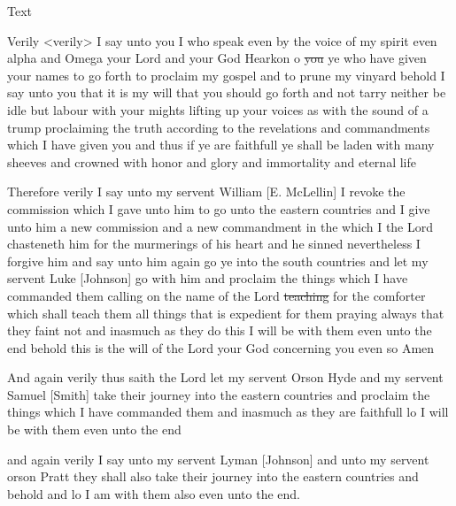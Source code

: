 			\begin{description}
				\item[Text]
			\end{description}
			
				Verily <verily> I say unto you I who speak even by the voice of my spirit even alpha and Omega your Lord and your God Hearkon o \sout{you} ye who have given your names to go forth to proclaim my gospel and to prune my vinyard behold I say unto you that it is my will that you should go forth and not tarry neither be idle but labour with your mights lifting up your voices as with the sound of a trump proclaiming the truth according to the revelations and commandments which I have given you and thus if ye are faithfull ye shall be laden with many sheeves and crowned with honor and glory and immortality and eternal life
				
				Therefore verily I say unto my servent William [E. McLellin] I revoke the commission which I gave unto him to go unto the eastern countries and I give unto him a new commission and a new commandment in the which I the Lord chasteneth him for the murmerings of his heart and he sinned nevertheless I forgive him and say unto him again go ye into the south countries and let my servent Luke [Johnson] go with him and proclaim the things which I have commanded them calling on the name of the Lord \sout{teaching} for the comforter which shall teach them all things that is expedient for them praying always that they faint not and inasmuch as they do this I will be with them even unto the end behold this is the will of the Lord your God concerning you even so Amen
				
				And again verily thus saith the Lord let my servent Orson Hyde and my servent Samuel [Smith] take their journey into the eastern countries and proclaim the things which I have commanded them and inasmuch as they are faithfull lo I will be with them even unto the end
				
				and again verily I say unto my servent Lyman [Johnson] and unto my servent orson Pratt they shall also take their journey into the eastern countries and behold and lo I am with them also even unto the end.
				
